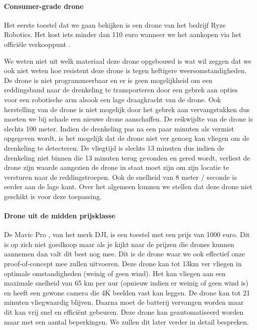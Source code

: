 \paragraph{Consumer-grade drone}

Het eerste toestel dat we gaan bekijken is een drone van het bedrijf Ryze Robotics. \autocite{CheapDrone} Het kost iets minder dan 110 euro wanneer we het aankopen via het officiële verkooppunt \autocite{CheapDroneOfficial}. 

We weten niet uit welk materiaal deze drone opgebouwd is wat wil zeggen dat we ook niet weten hoe resistent deze drone is tegen heftigere weersomstandigheden. De drone is niet programmeerbaar en er is geen mogelijkheid om een reddingsband naar de drenkeling te transporteren door een gebrek aan opties voor een robotische arm alsook een lage draagkracht van de drone. Ook herstelling van de drone is niet mogelijk door het gebrek aan vervangstukken dus moeten we bij schade een nieuwe drone aanschaffen. De reikwijdte van de drone is slechts 100 meter. Indien de drenkeling pas na een paar minuten als vermist opgegeven wordt, is het mogelijk dat de drone niet ver genoeg kan vliegen om de drenkeling te detecteren. De vliegtijd is slechts 13 minuten dus indien de drenkeling niet binnen die 13 minuten terug gevonden en gered wordt, verliest de drone zijn waarde aangezien de drone  in staat moet zijn om zijn locatie te versturen naar de reddingstroepen. Ook de snelheid van 8 meter / seconde is eerder aan de lage kant.
Over het algemeen kunnen we stellen dat deze drone niet geschikt is voor deze toepassing.

\paragraph{Drone uit de midden prijsklasse}

De Mavic Pro \autocite{MavicPro}, van het merk DJI, is een toestel met een prijs van 1000 euro. Dit is op zich niet goedkoop maar als je kijkt naar de prijzen die drones kunnen aannemen dan valt dit best nog mee. Dit is de drone waar we ook effectief onze proof-of-concept mee zullen uitvoeren. Deze drone kan tot 13km ver vliegen in optimale omstandigheden (weinig of geen wind). Het kan vliegen aan een maximale snelheid van 65 km per uur (opnieuw indien er weinig of geen wind is) en heeft een gewone camera die 4K beelden vast kan leggen. De drone kan tot 21 minuten vliegwaardig blijven. Daarna moet de batterij vervangen worden maar dit kan vrij snel en efficiënt gebeuren. Deze drone kan geautomatiseerd worden maar met een aantal beperkingen. We zullen dit later verder in detail bespreken.

